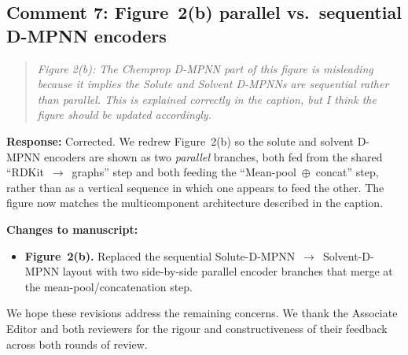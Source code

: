 \documentclass[11pt]{article}
\newenvironment{reviewer}{%
  \begin{quote}\itshape\color{black!70}}{%
  \end{quote}}
\newcommand{\response}[1]{\noindent\textbf{Response:} #1\par\medskip}
\newenvironment{changes}{%
  \noindent\textbf{Changes to manuscript:}
  \begin{itemize}[leftmargin=2em,itemsep=2pt]}{%
  \end{itemize}\medskip}
\begin{document}
\subsection*{Comment 7: Figure~2(b) parallel vs.\ sequential D-MPNN encoders}
\begin{reviewer}
Figure 2(b): The Chemprop D-MPNN part of this figure is misleading because it implies the Solute and Solvent D-MPNNs are sequential rather than parallel. This is explained correctly in the caption, but I think the figure should be updated accordingly.
\end{reviewer}
\response{Corrected. We redrew Figure~2(b) so the solute and solvent D-MPNN encoders are shown as two \emph{parallel} branches, both fed from the shared ``RDKit~$\to$~graphs'' step and both feeding the ``Mean-pool~$\oplus$~concat'' step, rather than as a vertical sequence in which one appears to feed the other. The figure now matches the multicomponent architecture described in the caption.}
\begin{changes}
  \item \textbf{Figure~2(b).} Replaced the sequential Solute-D-MPNN~$\rightarrow$~Solvent-D-MPNN layout with two side-by-side parallel encoder branches that merge at the mean-pool/concatenation step.
\end{changes}

\clearpage

We hope these revisions address the remaining concerns. We thank the Associate Editor and both reviewers for the rigour and constructiveness of their feedback across both rounds of review.



\end{document}
